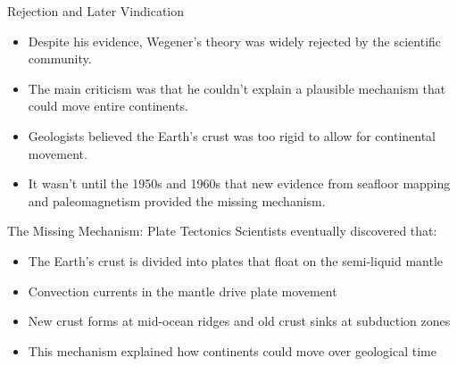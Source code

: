 \documentclass{beamer}
\begin{document}
\begin{frame}{Rejection and Later Vindication}
    \begin{itemize}
        \item Despite his evidence, Wegener's theory was widely rejected by the scientific community.
        \item The main criticism was that he couldn't explain a plausible mechanism that could move entire continents.
        \item Geologists believed the Earth's crust was too rigid to allow for continental movement.
        \item It wasn't until the 1950s and 1960s that new evidence from seafloor mapping and paleomagnetism provided the missing mechanism.
    \end{itemize}
    
    \begin{block}{The Missing Mechanism: Plate Tectonics}
        Scientists eventually discovered that:
        \begin{itemize}
            \item The Earth's crust is divided into plates that float on the semi-liquid mantle
            \item Convection currents in the mantle drive plate movement
            \item New crust forms at mid-ocean ridges and old crust sinks at subduction zones
            \item This mechanism explained how continents could move over geological time
        \end{itemize}
    \end{block}
\end{frame}
\end{document}
